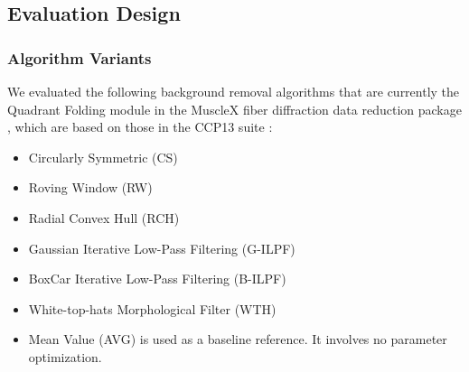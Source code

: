 \documentclass[iucr,review]{iucrjournals}
\begin{document}


\subsection{Evaluation Design}
\subsubsection{Algorithm Variants}

We evaluated the following background removal algorithms that are currently the Quadrant Folding module
in the MuscleX fiber diffraction data reduction package \cite{JiratrakanvongEtAl2024}, which are based on those in the CCP13 suite \cite{HeEtAl2007}:

\begin{itemize}
        \item Circularly Symmetric (CS)
        \item Roving Window (RW)
        \item Radial Convex Hull (RCH) %
        \item Gaussian Iterative Low-Pass Filtering (G-ILPF)
        \item BoxCar Iterative Low-Pass Filtering (B-ILPF)
        \item White-top-hats Morphological Filter (WTH)
        \item Mean Value (AVG) is used as a baseline reference. It involves no parameter optimization.
\end{itemize}
\end{document}
